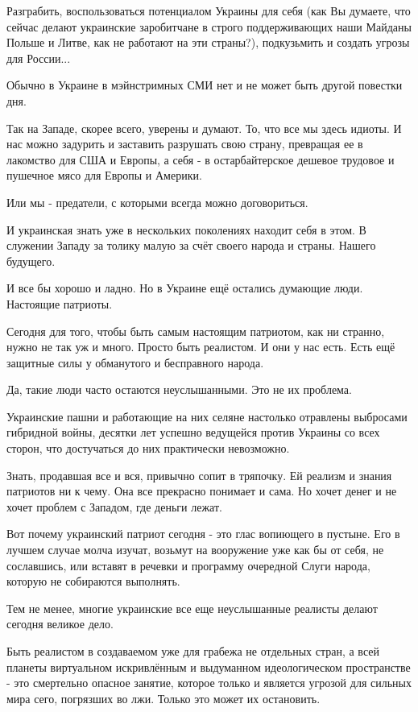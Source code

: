 Разграбить, воспользоваться потенциалом Украины для себя (как Вы думаете, что
сейчас делают украинские заробитчане в строго поддерживающих наши Майданы
Польше и Литве, как не работают на эти страны?), подкузьмить и создать угрозы
для России...

Обычно в Украине в мэйнстримных СМИ нет и не может быть другой повестки дня.

Так на Западе, скорее всего, уверены и думают. То, что все мы здесь идиоты. И
нас можно задурить и заставить разрушать свою страну, превращая ее в лакомство
для США и Европы, а себя - в остарбайтерское дешевое трудовое и пушечное мясо
для Европы и Америки.

Или мы - предатели, с которыми всегда можно договориться.

И украинская знать уже в нескольких поколениях находит себя в этом. В служении
Западу за толику малую за счёт своего народа и страны. Нашего будущего.

И все бы хорошо и ладно. Но в Украине ещё остались думающие люди. Настоящие патриоты.

Сегодня для того, чтобы быть самым настоящим патриотом, как ни странно, нужно
не так уж и много. Просто быть реалистом. И они у нас есть. Есть ещё защитные
силы у обманутого и бесправного народа.

Да, такие люди часто остаются неуслышанными. Это не их проблема.

Украинские пашни и работающие на них селяне настолько отравлены выбросами
гибридной войны, десятки лет успешно ведущейся против Украины со всех сторон,
что достучаться до них практически невозможно.

Знать, продавшая все и вся, привычно сопит в тряпочку. Ей  реализм и знания
патриотов ни к чему. Она все прекрасно понимает и сама. Но хочет денег и не
хочет проблем с Западом, где деньги лежат.

Вот почему украинский патриот сегодня - это глас вопиющего в пустыне. Его в
лучшем случае молча изучат, возьмут на вооружение уже как бы от себя, не
сославшись, или вставят в речевки и программу очередной Слуги народа, которую
не собираются выполнять.

Тем не менее, многие украинские все еще неуслышанные реалисты делают сегодня
великое дело.

Быть реалистом в создаваемом уже для грабежа не отдельных стран, а всей планеты
виртуальном искривлённым и выдуманном идеологическом пространстве - это
смертельно опасное занятие, которое только и является угрозой для сильных мира
сего, погрязших во лжи. Только это может их остановить.

